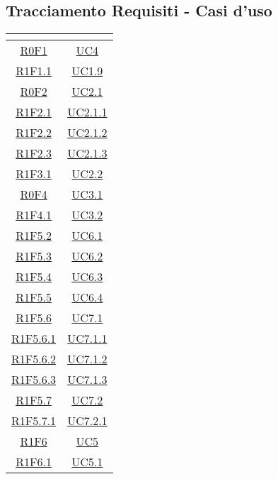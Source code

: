 \subsection{Tracciamento Requisiti - Casi d'uso}
\normalsize
\renewcommand{\arraystretch}{1.5}
\begin{longtable}{|c|c|}
	\hline
	\rowcolor{title_row}
\textbf{\color{title_text}{Codice Requisiti}} & \textbf{\color{title_text}{Codice Casi d'uso}} \\
\hline
\endhead
\hyperlink{R0F1}{R0F1} & \hyperlink{UC4}{UC4}\\
\hline
\hyperlink{R1F1.1}{R1F1.1} & \hyperlink{UC1.9}{UC1.9}\\
\hline
\hyperlink{R0F2}{R0F2} & \hyperlink{UC2.1}{UC2.1}\\
\hline
\hyperlink{R1F2.1}{R1F2.1} & \hyperlink{UC2.1.1}{UC2.1.1}\\
\hline
\hyperlink{R1F2.2}{R1F2.2} & \hyperlink{UC2.1.2}{UC2.1.2}\\
\hline
\hyperlink{R1F2.3}{R1F2.3} & \hyperlink{UC2.1.3}{UC2.1.3}\\
\hline
\hyperlink{R1F3.1}{R1F3.1} & \hyperlink{UC2.2}{UC2.2}\\
\hline
\hyperlink{R0F4}{R0F4} & \hyperlink{UC3.1}{UC3.1}\\
\hline
\hyperlink{R1F4.1}{R1F4.1} & \hyperlink{UC3.2}{UC3.2}\\
\hline
\hyperlink{R1F5.2}{R1F5.2} & \hyperlink{UC6.1}{UC6.1}\\
\hline
\hyperlink{R1F5.3}{R1F5.3} & \hyperlink{UC6.2}{UC6.2}\\
\hline
\hyperlink{R1F5.4}{R1F5.4} & \hyperlink{UC6.3}{UC6.3}\\
\hline
\hyperlink{R1F5.5}{R1F5.5} & \hyperlink{UC6.4}{UC6.4}\\
\hline
\hyperlink{R1F5.6}{R1F5.6} & \hyperlink{UC7.1}{UC7.1}\\
\hline
\hyperlink{R1F5.6.1}{R1F5.6.1} & \hyperlink{UC7.1.1}{UC7.1.1}\\
\hline
\hyperlink{R1F5.6.2}{R1F5.6.2} & \hyperlink{UC7.1.2}{UC7.1.2}\\
\hline
\hyperlink{R1F5.6.3}{R1F5.6.3} & \hyperlink{UC7.1.3}{UC7.1.3}\\
\hline
\hyperlink{R1F5.7}{R1F5.7} & \hyperlink{UC7.2}{UC7.2}\\
\hline
\hyperlink{R1F5.7.1}{R1F5.7.1} & \hyperlink{UC7.2.1}{UC7.2.1}\\
\hline
\hyperlink{R1F6}{R1F6} & \hyperlink{UC5}{UC5}\\
\hline
\hyperlink{R1F6.1}{R1F6.1} & \hyperlink{UC5.1}{UC5.1}\\

\end{longtable}
